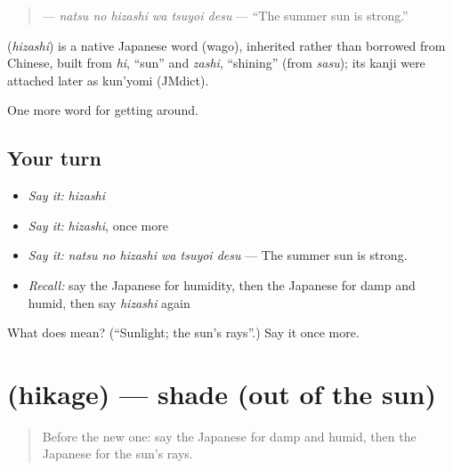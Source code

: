 \begin{quote}
\textbf{  } — \emph{natsu no hizashi wa tsuyoi desu} — \textquotedblleft{}The summer sun is strong.\textquotedblright{}
\end{quote}

\begin{cousinweb}
\textbf{} (\emph{hizashi}) is a native Japanese word (wago), inherited rather than borrowed from Chinese, built from \emph{hi}, \textquotedblleft{}sun\textquotedblright{} and \emph{zashi}, \textquotedblleft{}shining\textquotedblright{} (from \emph{sasu}); its kanji were attached later as kun'yomi (JMdict).
\end{cousinweb}

\begin{grammarlens}[title={What you've built}]
One more word for getting around.
\end{grammarlens}

\subsection*{Your turn}
\begin{itemize}
\raggedright
  \item \emph{Say it:} \emph{hizashi}
  \item \emph{Say it:} \emph{hizashi}, once more
  \item \emph{Say it:} \emph{natsu no hizashi wa tsuyoi desu} — The summer sun is strong.
  \item \emph{Recall:} say the Japanese for humidity, then the Japanese for damp and humid, then say \emph{hizashi} again
\end{itemize}

\begin{tcolorbox}[breakable,colback=teal!4,colframe=teal!35!black,title={Before you move on}]
What does  mean? (\textquotedblleft{}Sunlight; the sun's rays\textquotedblright{}.) Say it once more.
\end{tcolorbox}
\section[\texorpdfstring{\ja{ひかげ} (hikage)}{ひかげ (hikage)}]{ (hikage) — shade (out of the sun)}

\label{lesson:JA-C414-hikage}



\begin{quote}
Before the new one: say the Japanese for damp and humid, then the Japanese for the sun's rays.
\end{quote}

